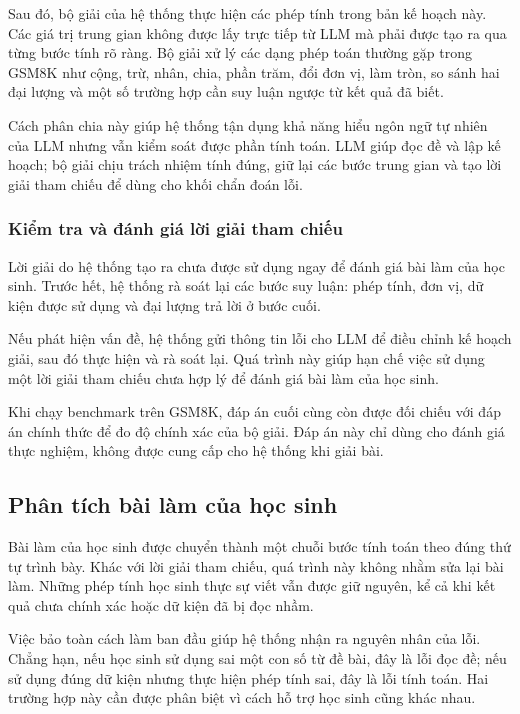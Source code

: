 \documentclass[12pt,a4paper]{article}
\begin{document}
Sau đó, bộ giải của hệ thống thực hiện các phép tính trong bản kế hoạch này. Các
giá trị trung gian không được lấy trực tiếp từ LLM mà phải được tạo ra qua từng
bước tính rõ ràng. Bộ giải xử lý các dạng phép toán thường gặp trong GSM8K như
cộng, trừ, nhân, chia, phần trăm, đổi đơn vị, làm tròn, so sánh hai đại lượng và
một số trường hợp cần suy luận ngược từ kết quả đã biết.

Cách phân chia này giúp hệ thống tận dụng khả năng hiểu ngôn ngữ tự nhiên của
LLM nhưng vẫn kiểm soát được phần tính toán. LLM giúp đọc đề và lập kế hoạch;
bộ giải chịu trách nhiệm tính đúng, giữ lại các bước trung gian và tạo lời giải
tham chiếu để dùng cho khối chẩn đoán lỗi.

\subsubsection{Kiểm tra và đánh giá lời giải tham chiếu}

Lời giải do hệ thống tạo ra chưa được sử dụng ngay để đánh giá bài làm của học
sinh. Trước hết, hệ thống rà soát lại các bước suy luận: phép tính, đơn vị, dữ
kiện được sử dụng và đại lượng trả lời ở bước cuối.

Nếu phát hiện vấn đề, hệ thống gửi thông tin lỗi cho LLM để điều chỉnh kế hoạch
giải, sau đó thực hiện và rà soát lại. Quá trình này giúp hạn chế việc sử dụng
một lời giải tham chiếu chưa hợp lý để đánh giá bài làm của học sinh.

Khi chạy benchmark trên GSM8K, đáp án cuối cùng còn được đối chiếu với đáp án
chính thức để đo độ chính xác của bộ giải. Đáp án này chỉ dùng cho đánh giá thực
nghiệm, không được cung cấp cho hệ thống khi giải bài.

\subsection{Phân tích bài làm của học sinh}

Bài làm của học sinh được chuyển thành một chuỗi bước tính toán theo đúng thứ
tự trình bày. Khác với lời giải tham chiếu, quá trình này không nhằm sửa lại bài
làm. Những phép tính học sinh thực sự viết vẫn được giữ nguyên, kể cả khi kết
quả chưa chính xác hoặc dữ kiện đã bị đọc nhầm.

Việc bảo toàn cách làm ban đầu giúp hệ thống nhận ra nguyên nhân của lỗi. Chẳng
hạn, nếu học sinh sử dụng sai một con số từ đề bài, đây là lỗi đọc đề; nếu sử
dụng đúng dữ kiện nhưng thực hiện phép tính sai, đây là lỗi tính toán. Hai
trường hợp này cần được phân biệt vì cách hỗ trợ học sinh cũng khác nhau.
\end{document}
